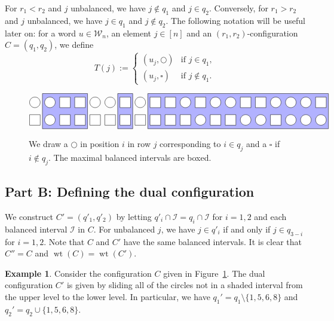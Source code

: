 \documentclass[reqno]{amsart}
\newcommand{\0}{\phantom{c}}
\DeclareMathOperator{\wt}{wt} %
\newcommand{\mcW}{\mathcal{W}}
\newcommand{\mcI}{\mathcal{I}}
\newcommand{\ive}[1]{\left[ #1 \right]}
\theoremstyle{plain}
\theoremstyle{definition}
\newtheorem{example}[thm]{Example}
\numberwithin{equation}{section}
\begin{document}
For $r_1 < r_2$ and $j$ unbalanced, we have $j \notin q_1$ and $j \in q_2$.
Conversely, for $r_1 > r_2$ and $j$ unbalanced, we have $j \in q_1$ and $j \notin q_2$.
The following notation will be useful later on: for a word $u \in \mcW_n$, an element $j \in \ive{n}$ and an $(r_1, r_2)$-configuration $C = (q_1, q_2)$, we define
\[
T(j) := \begin{cases}
(u_j, \bigcirc) & \text{if } j \in q_1, \\
(u_j, \square) & \text{if } j \notin q_1.
\end{cases}
\]

\begin{figure}[t]
\[
\begin{tikzpicture}[scale=0.75]
  \def\sc{0.85}   %
  \def\ll{2}   %
  \def\l{1}   %
  \draw[fill=blue!30] (1.5*\sc,\l-.5) rectangle(4.5*\sc,\ll+.5);
  \draw[fill=blue!30] (6.5*\sc,\l-.5) rectangle(7.5*\sc,\ll+.5);
  \draw[fill=blue!30] (8.5*\sc,\l-.5) rectangle(20.5*\sc,\ll+.5);
  \foreach \i in {1,2,5,6,8,11,13,14,17,18,19} { \draw[fill=white] (\i*\sc,\ll) circle (0.3); }
  \foreach \i in {3,4,7,9,10,12,15,16,20} { \draw[fill=white] (\i*\sc-.3,\ll-.3) rectangle +(0.6,+0.6); }
  \foreach \i in {2,12,15,16,18,19,20} { \draw[fill=white] (\i*\sc,\l) circle (0.3); }
  \foreach \i in {1,3,4,5,6,7,8,9,10,11,13,14,17} { \draw[fill=white] (\i*\sc-.3,\l-.3) rectangle +(0.6,+0.6); }
\end{tikzpicture}
\]
\caption{We draw a $\bigcirc$ in position $i$ in row $j$ corresponding to $i \in q_j$ and a $\square$ if $i \notin q_j$.
The maximal balanced intervals are boxed.}
\label{fig:balanced}
\end{figure}


\subsection*{Part B: Defining the dual configuration}

We construct $C' = (q'_1, q'_2)$ by letting $q'_i \cap \mcI = q_i \cap \mcI$ for $i=1,2$ and each balanced interval $\mcI$ in $C$.
For unbalanced $j$, we have $j \in q'_i$ if and only if $j \in q_{3-i}$ for $i = 1,2$.
Note that $C$ and $C'$ have the same balanced intervals.
It is clear that $C'' = C$ and $\wt(C) = \wt(C')$.

\begin{example}
Consider the configuration $C$ given in Figure~\ref{fig:balanced}.
The dual configuration $C'$ is given by sliding all of the circles not in a shaded interval from the upper level to the lower level.
In particular, we have $q_1' = q_1 \setminus \{1,5,6,8\}$ and $q_2' = q_2 \cup \{1,5,6,8\}$.
\end{example}
\end{document}
